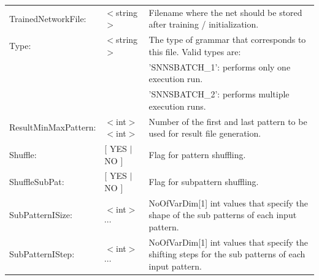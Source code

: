 {\begin{tabular}{|llp{70mm}|}
TrainedNetworkFile:   &$<$string$>$     & Filename where the net should
be stored after training / initialization.\\ 

Type:           &$<$string$>$   &The type of grammar that corresponds
to this file. Valid types are:\\  & &'SNNSBATCH\_1': performs only one
execution run.\\  & &'SNNSBATCH\_2': performs multiple execution runs.\\  

ResultMinMaxPattern:    &$<$int$>$ $<$int$>$ &Number of the first and
last pattern to be used for result file generation.\\ 

Shuffle:        &[ YES $|$ NO ]         &Flag for pattern shuffling.\\ 

ShuffleSubPat:  &[ YES $|$ NO ]         &Flag for subpattern shuffling.\\ 

SubPatternISize: &$<$int$>$ $\cdots$ &NoOfVarDim[1] int values that specify
the shape of the sub patterns of each input pattern.\\ 

SubPatternIStep: &$<$int$>$ $\cdots$ &NoOfVarDim[1] int values that
specify the shifting steps for the sub patterns of each input pattern.\\ 
\hline
\end{tabular}
}

